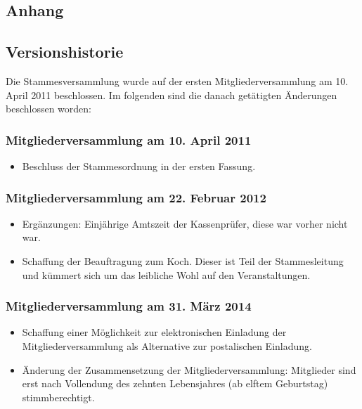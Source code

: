 \documentclass[a4paper]{article}
\begin{document}
\begin{appendix}
\section{Anhang} %
\label{sec:anhang}

    \subsection{Versionshistorie} %
    \label{sub:versionshistorie}
    Die Stammesversammlung wurde auf der ersten Mitgliederversammlung am 10. April 2011 beschlossen. Im folgenden sind die danach getätigten Änderungen beschlossen worden:
        \subsubsection{Mitgliederversammlung am 10. April 2011} %
        \label{ssub:stammesversammlung_10_april_2011}
        \begin{itemize}
            \item Beschluss der Stammesordnung in der ersten Fassung.
        \end{itemize}
    
        \subsubsection{Mitgliederversammlung am 22. Februar 2012} %
        \label{ssub:stam}
            \begin{itemize}
                \item Ergänzungen: Einjährige Amtszeit der Kassenprüfer, diese war vorher nicht war.
                \item Schaffung der Beauftragung zum Koch. Dieser ist Teil der Stammesleitung und kümmert sich um das leibliche Wohl auf den Veranstaltungen.
            \end{itemize}
        \subsubsection{Mitgliederversammlung am 31. März 2014} %
        \label{ssub:mitgliederversammlung_am_31_marz_2014}
            \begin{itemize}
                \item Schaffung einer Möglichkeit zur elektronischen Einladung der Mitgliederversammlung als Alternative zur postalischen Einladung.
                \item Änderung der Zusammensetzung der Mitgliederversammlung: Mitglieder sind erst nach Vollendung des zehnten Lebensjahres (ab elftem Geburtstag) stimmberechtigt.
            \end{itemize}



\end{appendix}
\end{document}
